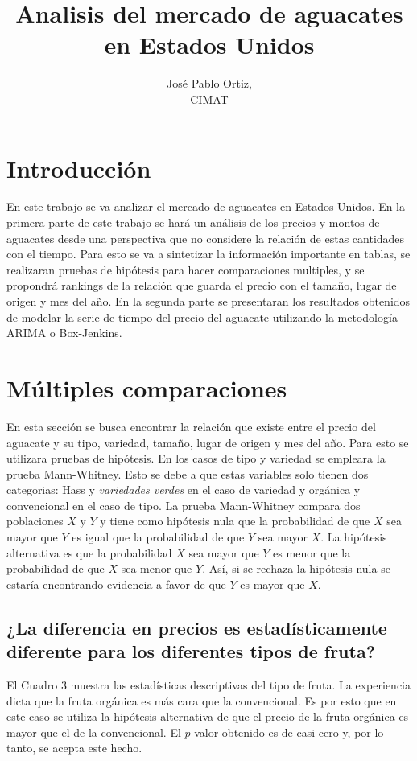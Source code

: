 \documentclass{article}
\begin{document}
\onehalfspacing 

\title{Analisis del mercado de aguacates en Estados Unidos}

\author{José Pablo Ortiz, \\CIMAT}
\maketitle

\section{Introducción}
En este trabajo se va analizar el mercado de aguacates en Estados Unidos. En la primera parte de este trabajo se hará un análisis de los precios y montos de aguacates desde una perspectiva que no considere la relación de estas cantidades con el tiempo. Para esto se va a sintetizar la información importante en tablas, se realizaran pruebas de hipótesis para hacer comparaciones multiples, y se propondrá  rankings de la relación que guarda el precio con el tamaño, lugar de origen y mes del año. En la segunda parte se presentaran los resultados obtenidos de modelar la serie de tiempo del precio del aguacate utilizando la metodología ARIMA o Box-Jenkins. 
\section{Múltiples comparaciones}

En esta sección se busca encontrar la relación que existe entre el precio del aguacate y su tipo, variedad, tamaño, lugar de origen y mes del año. Para esto se utilizara pruebas de hipótesis. En los casos de tipo y variedad se empleara la prueba Mann-Whitney. Esto se debe a que estas variables solo tienen dos categorias: Hass y  \textit{variedades verdes} en el caso de variedad y orgánica y convencional en el caso de tipo. La prueba Mann-Whitney compara dos poblaciones $X$ y $Y$ y tiene como hipótesis nula que la probabilidad de que $X$ sea mayor que $Y$ es igual que la probabilidad de que $Y$ sea mayor $X$. La hipótesis alternativa es que la probabilidad  $X$ sea mayor que $Y$ es menor que la probabilidad de que $X$ sea menor que $Y$. Así, si se rechaza la hipótesis nula se estaría encontrando evidencia a favor de que $Y$ es mayor que $X$.
\\

\subsection*{¿La diferencia en precios es estadísticamente diferente para los diferentes tipos de fruta?}
El Cuadro 3 muestra las estadísticas descriptivas del tipo de fruta. La experiencia dicta que la fruta orgánica es más cara que la convencional. Es por esto que en este caso se utiliza la hipótesis alternativa de que el precio de la fruta orgánica es mayor que el de la convencional. El $p$-valor obtenido es de casi cero y, por lo tanto, se acepta este hecho.
\end{document}
